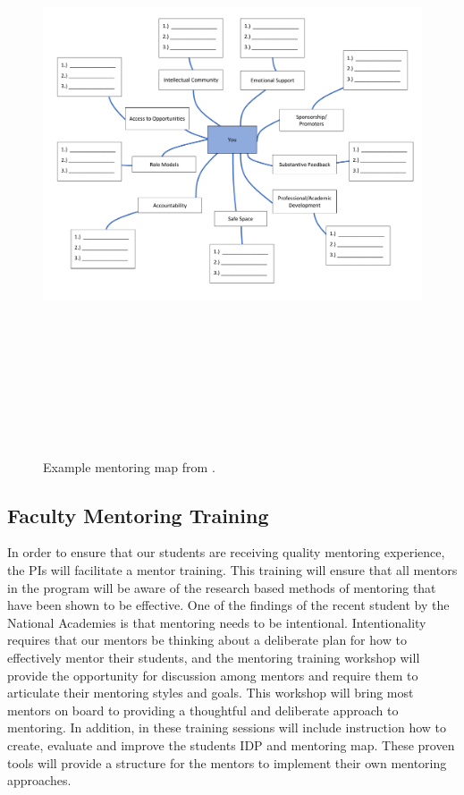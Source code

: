 \documentclass[12pt]{article}
\begin{document}
\begin{figure}
    \centering
    \includegraphics[height=7in]{mentoringmap.pdf}
    \caption{Example mentoring map from \citet{Bosch}.
    \label{fig:map}}
\end{figure}

\subsection{Faculty Mentoring Training}\label{sect:facultytraining}

In order to ensure that our students are receiving quality mentoring experience, the PIs will facilitate a mentor training.  This training will ensure that all mentors in the program will be aware of the research based methods of mentoring that have been shown to be effective.  One of the findings of the recent student by the National Academies is that mentoring needs to be intentional.  Intentionality requires that our mentors be thinking about a deliberate plan for how to effectively mentor their students, and the mentoring training workshop will provide the opportunity for discussion among mentors and require them to articulate their mentoring styles and goals. This workshop will bring most mentors on board to providing a thoughtful and deliberate approach to mentoring.  In addition, in these training sessions will include instruction how to create, evaluate and improve the students IDP and mentoring map. These proven tools will provide a structure for the mentors to implement their own mentoring approaches.  
\end{document}
